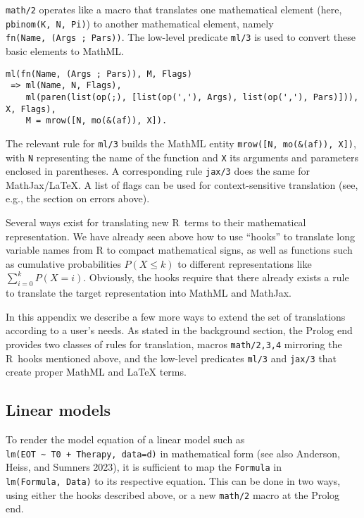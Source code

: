 \texttt{math/2} operates like a macro that translates one mathematical element
(here, \texttt{pbinom(K,~N,~Pi)}) to another mathematical element, namely
\texttt{fn(Name,~(Args~;~Pars))}. The low-level predicate \texttt{ml/3} is used to
convert these basic elements to MathML.

\begin{verbatim}
ml(fn(Name, (Args ; Pars)), M, Flags)
 => ml(Name, N, Flags),
    ml(paren(list(op(;), [list(op(','), Args), list(op(','), Pars)])), X, Flags),
    M = mrow([N, mo(&(af)), X]).
\end{verbatim}

The relevant rule for \texttt{ml/3} builds the MathML entity
\texttt{mrow({[}N,\ mo(\&(af)),\ X{]})}, with \texttt{N} representing the name of the
function and \texttt{X} its arguments and parameters enclosed in parentheses. A
corresponding rule \texttt{jax/3} does the same for MathJax/LaTeX. A list of
flags can be used for context-sensitive translation (see, e.g., the
section on errors above).

Several ways exist for translating new R~terms to their mathematical
representation. We have already seen above how to use ``hooks'' to
translate long variable names from R to compact mathematical signs, as
well as functions such as cumulative probabilities \(P(X \le k)\) to
different representations like \(\sum_{i=0}^k P(X = i)\). Obviously, the
hooks require that there already exists a rule to translate the target
representation into MathML and MathJax.

In this appendix we describe a few more ways to extend the set of
translations according to a user's needs. As stated in the background
section, the Prolog end provides two classes of rules for translation,
macros \texttt{math/2,3,4} mirroring the R~hooks mentioned above, and the
low-level predicates \texttt{ml/3} and \texttt{jax/3} that create proper MathML and
LaTeX terms.

\hypertarget{linear-models}{%
\subsection{Linear models}\label{linear-models}}

To render the model equation of a linear model such as
\texttt{lm(EOT~\textasciitilde{}~T0~+~Therapy,~data=d)} in mathematical form (see also Anderson, Heiss, and Sumners 2023),
it is sufficient to map the
\texttt{Formula} in \texttt{lm(Formula,~Data)} to its respective equation. This can be
done in two ways, using either the hooks described above, or a new
\texttt{math/2} macro at the Prolog end.


